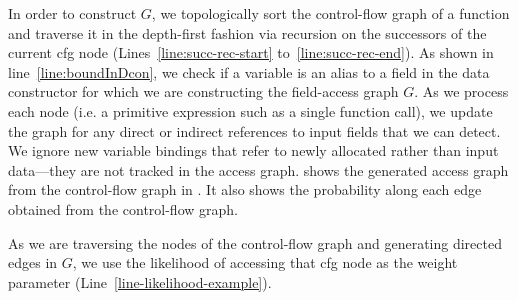 In order to construct $G$, we topologically sort the control-flow graph of a function %
and traverse it in the depth-first fashion via recursion on the successors of the current cfg node (Lines~\ref{line:succ-rec-start} to~\ref{line:succ-rec-end}).
%
As shown in line~\ref{line:boundInDcon}, we check if a variable is an alias to a field in the data
constructor for which we are constructing the field-access graph $G$.
%
As we process each node (i.e. a primitive expression such as a single
function call), we update the graph for any direct or indirect
references to input fields that we can detect.
%
We ignore new variable bindings that refer to newly allocated rather
than input data---they are not tracked in the access graph.
%
%
%
%
 shows the generated access graph from the control-flow graph in . It also shows the probability along each edge obtained from the control-flow graph.


As we are traversing the nodes of the control-flow graph and generating directed edges in $G$, we use the likelihood of accessing that cfg node as the weight parameter (Line~\ref{line-likelihood-example}).

